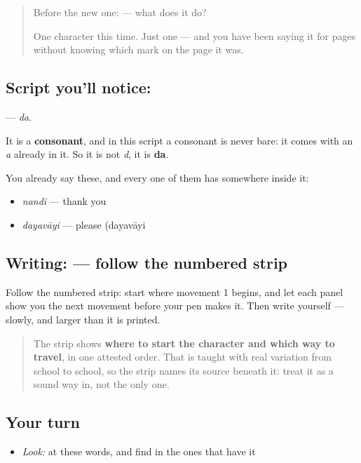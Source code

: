 \label{lesson:ML-S123-letter-da}



\begin{quote}
Before the new one:  — what does it do?

One character this time. Just one — and you have been saying it for pages without knowing which mark on the page it was.
\end{quote}

\subsection*{Script you'll notice: }
\textbf{} — \emph{da}.

It is a \textbf{consonant}, and in this script a consonant is never bare: it comes with an \emph{a} already in it. So it is not \emph{d}, it is \textbf{da}.

You already say these, and every one of them has  somewhere inside it:

\begin{itemize}
\raggedright
  \item \textbf{} \emph{nandi} — thank you
  \item \textbf{} \emph{dayavāyi} — please (dayavāyi
\end{itemize}

\subsection*{Writing:  — follow the numbered strip}

Follow the numbered strip: start where movement 1 begins, and let each panel show you the next movement before your pen makes it. Then write  yourself — slowly, and larger than it is printed.

\begin{quote}
The strip shows \textbf{where to start the character and which way to travel}, in one attested order. That is taught with real variation from school to school, so the strip names its source beneath it: treat it as a sound way in, not the only one.
\end{quote}

\subsection*{Your turn}
\begin{itemize}
\raggedright
  \item \emph{Look:} at these words, and find  in the ones that have it
\end{itemize}

